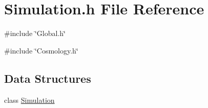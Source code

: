 \section{Simulation.h File Reference}
\label{Simulation_8h}
{\ttfamily \#include \char`\"{}Global.h\char`\"{}}\par
{\ttfamily \#include \char`\"{}Cosmology.h\char`\"{}}\par
\subsection*{Data Structures}
\begin{DoxyCompactItemize}
\item 
class \hyperlink{classSimulation}{Simulation}
\end{DoxyCompactItemize}
